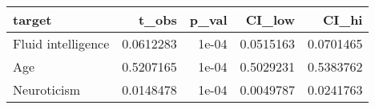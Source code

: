 
\begin{tabular}{l|r|r|r|r}
\hline
target & t\_obs & p\_val & CI\_low & CI\_hi\\
\hline
Fluid intelligence & 0.0612283 & 1e-04 & 0.0515163 & 0.0701465\\
\hline
Age & 0.5207165 & 1e-04 & 0.5029231 & 0.5383762\\
\hline
Neuroticism & 0.0148478 & 1e-04 & 0.0049787 & 0.0241763\\
\hline
\end{tabular}
